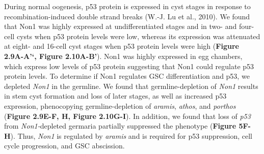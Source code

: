 \documentclass[12pt,oneside]{reedthesis}
\begin{document}
During normal oogenesis, p53 protein is expressed in cyst stages in response to recombination-induced double strand breaks (W.-J. Lu et al., 2010). We found that Non1 was highly expressed at undifferentiated stages and in two- and four-cell cysts when p53 protein levels were low, whereas its expression was attenuated at eight- and 16-cell cyst stages when p53 protein levels were high (\textbf{Figure 2.9A-A'`\textbf{, }Figure 2.10A-B'}). Non1 was highly expressed in egg chambers, which express low levels of p53 protein suggesting that Non1 could regulate p53 protein levels. To determine if Non1 regulates GSC differentiation and p53, we depleted \emph{Non1} in the germline. We found that germline-depletion of \emph{Non1} results in stem cyst formation and loss of later stages, as well as increased p53 expression, phenocopying germline-depletion of \emph{aramis}, \emph{athos}, and \emph{porthos} (\textbf{Figure 2.9E-F, H, Figure 2.10G-I}). In addition, we found that loss of \emph{p53} from \emph{Non1-}depleted germaria partially suppressed the phenotype (\textbf{Figure 5F-H}). Thus, \emph{Non1} is regulated by \emph{aramis} and is required for p53 suppression, cell cycle progression, and GSC abscission.
\end{document}
